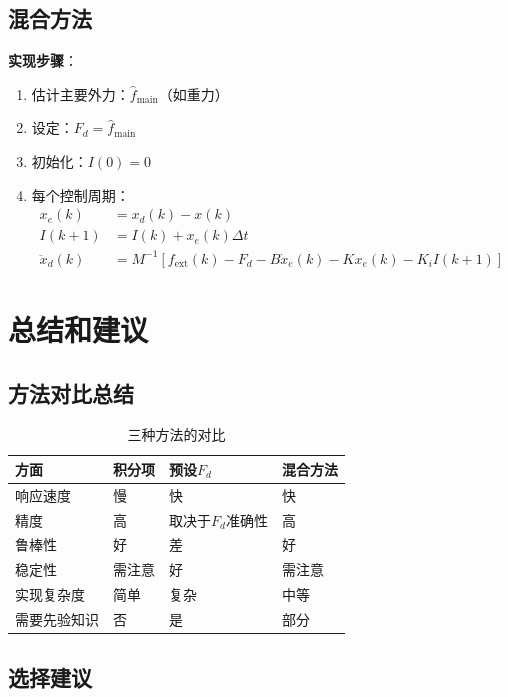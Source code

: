 \documentclass[12pt,a4paper]{article}
\begin{document}
\subsection{混合方法}

\textbf{实现步骤}：
\begin{enumerate}
\item 估计主要外力：$\hat{f}_{\text{main}}$（如重力）
\item 设定：$F_d = \hat{f}_{\text{main}}$
\item 初始化：$I(0) = 0$
\item 每个控制周期：
\begin{align}
x_e(k) &= x_d(k) - x(k) \\
I(k+1) &= I(k) + x_e(k) \Delta t \\
\ddot{x}_d(k) &= M^{-1}[f_{\text{ext}}(k) - F_d - B\dot{x}_e(k) - Kx_e(k) - K_i I(k+1)]
\end{align}
\end{enumerate}

\section{总结和建议}

\subsection{方法对比总结}

\begin{table}[h]
\centering
\begin{tabular}{|l|l|l|l|}
\hline
\textbf{方面} & \textbf{积分项} & \textbf{预设$F_d$} & \textbf{混合方法} \\
\hline
响应速度 & 慢 & 快 & 快 \\
\hline
精度 & 高 & 取决于$F_d$准确性 & 高 \\
\hline
鲁棒性 & 好 & 差 & 好 \\
\hline
稳定性 & 需注意 & 好 & 需注意 \\
\hline
实现复杂度 & 简单 & 复杂 & 中等 \\
\hline
需要先验知识 & 否 & 是 & 部分 \\
\hline
\end{tabular}
\caption{三种方法的对比}
\end{table}

\subsection{选择建议}
\end{document}
